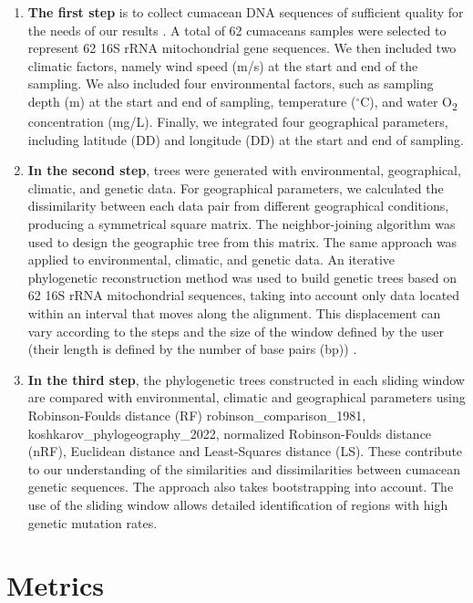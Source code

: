 \begin{enumerate}
\item \textbf{The first step} is to collect cumacean DNA sequences of sufficient quality for the needs of our results \citep{koshkarov_phylogeography_2022}. A total of 62 cumaceans samples were selected to represent 62 16S rRNA mitochondrial gene sequences. We then included two climatic factors, namely wind speed (m/s) at the start and end of the sampling. We also included four environmental factors, such as sampling depth (m) at the start and end of sampling, temperature ($^\circ$C), and water O\textsubscript{2} concentration (mg/L). Finally, we integrated four geographical parameters, including latitude (DD) and longitude (DD) at the start and end of sampling.

\item \textbf{In the second step}, trees were generated with environmental, geographical, climatic, and genetic data. For geographical parameters, we calculated the dissimilarity between each data pair from different geographical conditions, producing a symmetrical square matrix. The neighbor-joining algorithm was used to design the geographic tree from this matrix. The same approach was applied to environmental, climatic, and genetic data. An iterative phylogenetic reconstruction method was used to build genetic trees based on 62 16S rRNA mitochondrial sequences, taking into account only data located within an interval that moves along the alignment. This displacement can vary according to the steps and the size of the window defined by the user (their length is defined by the number of base pairs (bp)) \citep{koshkarov_phylogeography_2022}.

\item \textbf{In the third step}, the phylogenetic trees constructed in each sliding window are compared with environmental, climatic and geographical parameters using Robinson-Foulds distance (RF) {robinson_comparison_1981, koshkarov_phylogeography_2022}, normalized Robinson-Foulds distance (nRF), Euclidean distance and Least-Squares distance (LS). These contribute to our understanding of the similarities and dissimilarities between cumacean genetic sequences. The approach also takes bootstrapping into account. The use of the sliding window allows detailed identification of regions with high genetic mutation rates.
\end{enumerate}

\section{Metrics}\label{metrics}

